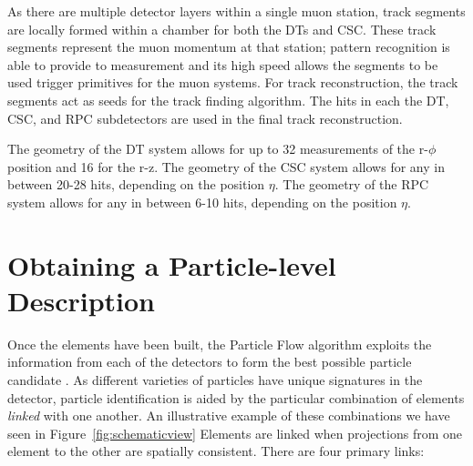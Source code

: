 As there are multiple detector layers within a single muon station, track segments are locally formed within a chamber for both the DTs and CSC. These track segments represent the muon momentum at that station; pattern recognition is able to provide to measurement and its high speed allows the segments to be used trigger primitives for the muon systems. For track reconstruction, the track segments act as seeds for the track finding algorithm. The hits in each the DT, CSC, and RPC subdetectors are used in the final track reconstruction.

The geometry of the DT system allows for up to 32 measurements of the r-$\phi$ position and 16 for the r-z. The geometry of the CSC system allows for any in between 20-28 hits, depending on the position $\eta$. The geometry of the RPC system allows for any in between 6-10 hits, depending on the position $\eta$. 

\section{Obtaining a Particle-level Description}

Once the elements have been built, the Particle Flow algorithm exploits the information from each of the detectors to form the best possible particle candidate \cite{CMS-PRF-14-001}. As different varieties of particles have unique signatures in the detector, particle identification is aided by the particular combination of elements \textit{linked} with one another. An illustrative example of these combinations we have seen in Figure~\ref{fig:schematicview}  Elements are linked when projections from one element to the other are spatially consistent. There are four primary links:

